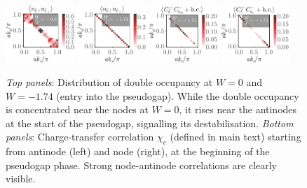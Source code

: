\documentclass[reprint,hidelinks,onecolumn]{revtex4-2}
\begin{document}
\begin{figure}[!htpb]
	\centering
	\includegraphics[width=0.23\textwidth]{doubOcc-1.pdf}
	\includegraphics[width=0.23\textwidth]{doubOcc-3.pdf}
	\includegraphics[width=0.23\textwidth]{cfantinode-3.pdf}
	\includegraphics[width=0.23\textwidth]{cfnode-3.pdf}
	\caption{{\it Top panels}: Distribution of double occupancy at \(W=0\) and \(W=-1.74\) (entry into the pseudogap). While the double occupancy is concentrated near the nodes at \(W=0\), it rises near the antinodes at the start of the pseudogap, signalling its destabilisation. {\it Bottom panels}: Charge-transfer correlation \(\chi_c\) (defined in main text) starting from antinode (left) and node (right), at the beginning of the pseudogap phase. Strong node-antinode correlations are clearly visible.}
	\label{cfnode}
\end{figure}
\end{document}

